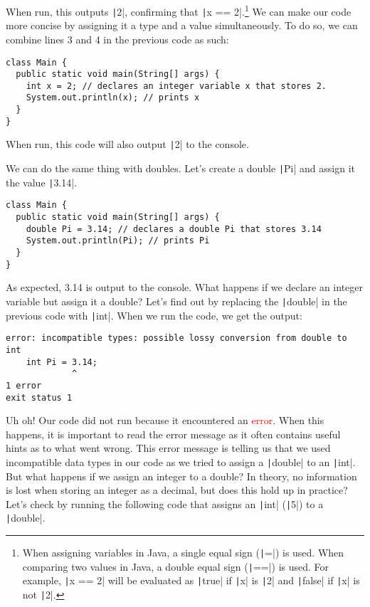 \documentclass{article}
\begin{document}
\newpage

When run, this outputs \texttt|2|, confirming that \texttt|x == 2|.\footnote{When assigning variables in Java, a single equal sign (\texttt|=|) is used. When comparing two values in Java, a double equal sign (\texttt|==|) is used. For example, \texttt|x == 2| will be evaluated as \texttt|true| if \texttt|x| is \texttt|2| and \texttt|false| if \texttt|x| is not \texttt|2|.} We can make our code more concise by assigning it a type and a value simultaneously. To do so, we can combine lines 3 and 4 in the previous code as such:

\begin{verbatim}
class Main {
  public static void main(String[] args) {
    int x = 2; // declares an integer variable x that stores 2.
    System.out.println(x); // prints x
  }
}
\end{verbatim}

When run, this code will also output \texttt|2| to the console.

\vspace{0.5cm}

We can do the same thing with doubles. Let's create a double \texttt|Pi| and assign it the value \texttt|3.14|.

\begin{verbatim}
class Main {
  public static void main(String[] args) {
    double Pi = 3.14; // declares a double Pi that stores 3.14
    System.out.println(Pi); // prints Pi
  }
}
\end{verbatim}

As expected, 3.14 is output to the console. What happens if we declare an integer variable but assign it a double? Let's find out by replacing the \texttt|double| in the previous code with \texttt|int|. When we run the code, we get the output:

\small
\begin{verbatim}
error: incompatible types: possible lossy conversion from double to int
    int Pi = 3.14;
             ^
1 error
exit status 1
\end{verbatim}

\normalsize
Uh oh! Our code did not run because it encountered an \textcolor{red}{error}. When this happens, it is important to read the error message as it often contains useful hints as to what went wrong. This error message is telling us that we used incompatible data types in our code as we tried to assign a \texttt|double| to an \texttt|int|. But what happens if we assign an integer to a double? In theory, no information is lost when storing an integer as a decimal, but does this hold up in practice? Let's check by running the following code that assigns an \texttt|int| (\texttt|5|) to a \texttt|double|.
\end{document}
